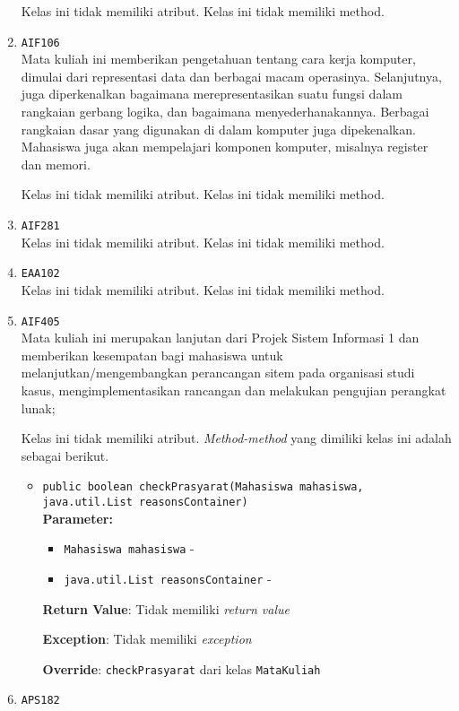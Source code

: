 \documentclass{article}
\begin{document}
\begin{enumerate}
Kelas ini tidak memiliki atribut. Kelas ini tidak memiliki method. \item \texttt{AIF106}\\ 
Mata kuliah ini memberikan pengetahuan tentang cara kerja komputer, dimulai 
 dari representasi data dan berbagai macam operasinya. Selanjutnya, juga 
 diperkenalkan bagaimana merepresentasikan suatu fungsi dalam rangkaian 
 gerbang logika, dan bagaimana menyederhanakannya. Berbagai rangkaian dasar 
 yang digunakan di dalam komputer juga dipekenalkan. Mahasiswa juga akan 
 mempelajari komponen komputer, misalnya register dan memori.

Kelas ini tidak memiliki atribut. Kelas ini tidak memiliki method. \item \texttt{AIF281}\\ 


Kelas ini tidak memiliki atribut. Kelas ini tidak memiliki method. \item \texttt{EAA102}\\ 


Kelas ini tidak memiliki atribut. Kelas ini tidak memiliki method. \item \texttt{AIF405}\\ 
Mata kuliah ini merupakan lanjutan dari Projek Sistem Informasi 1 dan
 memberikan kesempatan bagi mahasiswa untuk melanjutkan/mengembangkan
 perancangan sitem pada organisasi studi kasus, mengimplementasikan rancangan
 dan melakukan pengujian perangkat lunak;

Kelas ini tidak memiliki atribut. \textit{Method-method} yang dimiliki kelas ini adalah sebagai berikut.
\begin{itemize}
\item \texttt{public boolean checkPrasyarat(Mahasiswa mahasiswa, java.util.List reasonsContainer)}\\ 


\textbf{Parameter:}\begin{itemize}
\item \texttt{Mahasiswa mahasiswa} - 
\item \texttt{java.util.List reasonsContainer} - 
\end{itemize}
\textbf{Return Value}: Tidak memiliki \textit{return value}

\textbf{Exception}: Tidak memiliki \textit{exception}

\textbf{Override}: \texttt{checkPrasyarat} dari kelas \texttt{MataKuliah}

\end{itemize}
\item \texttt{APS182}\\ 



\end{enumerate}
\end{document}
